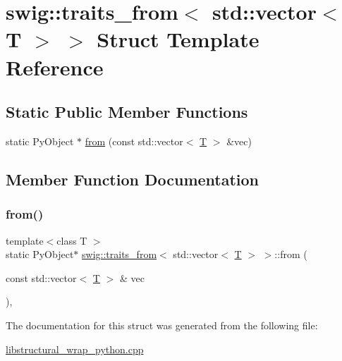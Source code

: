 \hypertarget{structswig_1_1traits__from_3_01std_1_1vector_3_01_t_01_4_01_4}{}\section{swig\+:\+:traits\+\_\+from$<$ std\+:\+:vector$<$ T $>$ $>$ Struct Template Reference}
\label{structswig_1_1traits__from_3_01std_1_1vector_3_01_t_01_4_01_4}
\subsection*{Static Public Member Functions}
\begin{DoxyCompactItemize}
\item 
static Py\+Object $\ast$ \hyperlink{structswig_1_1traits__from_3_01std_1_1vector_3_01_t_01_4_01_4_a4c2827dea351d54dea6d21c7a227134b}{from} (const std\+::vector$<$ \hyperlink{fmt_8h_a0acb682b8260ab1c60b918599864e2e5}{T} $>$ \&vec)
\end{DoxyCompactItemize}


\subsection{Member Function Documentation}
\mbox{\label{structswig_1_1traits__from_3_01std_1_1vector_3_01_t_01_4_01_4_a4c2827dea351d54dea6d21c7a227134b}} 
\subsubsection{\texorpdfstring{from()}{from()}}
{\footnotesize\ttfamily template$<$class T $>$ \\
static Py\+Object$\ast$ \hyperlink{structswig_1_1traits__from}{swig\+::traits\+\_\+from}$<$ std\+::vector$<$ \hyperlink{fmt_8h_a0acb682b8260ab1c60b918599864e2e5}{T} $>$ $>$\+::from (\begin{DoxyParamCaption}\item[{const std\+::vector$<$ \hyperlink{fmt_8h_a0acb682b8260ab1c60b918599864e2e5}{T} $>$ \&}]{vec }\end{DoxyParamCaption})\hspace{0.3cm}{\ttfamily [inline]}, {\ttfamily [static]}}



The documentation for this struct was generated from the following file\+:\begin{DoxyCompactItemize}
\item 
\hyperlink{libstructural__wrap__python_8cpp}{libstructural\+\_\+wrap\+\_\+python.\+cpp}\end{DoxyCompactItemize}
